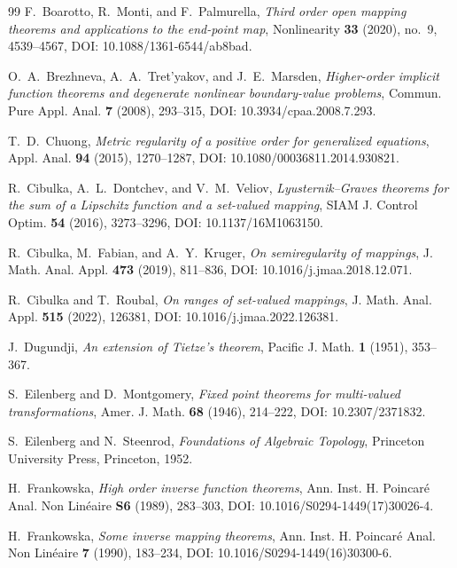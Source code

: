 \documentclass[11pt]{amsart}
\theoremstyle{definition}
\theoremstyle{remark}
\begin{document}
\begin{thebibliography}{99}
		F.~Boarotto, R.~Monti, and F.~Palmurella,
		\emph{Third order open mapping theorems and applications to the end-point
			map},
		Nonlinearity \textbf{33} (2020), no.~9, 4539--4567,
		DOI: 10.1088/1361-6544/ab8bad.
		
		O.~A.~Brezhneva, A.~A.~Tret'yakov, and J.~E.~Marsden,
		\emph{Higher-order implicit function theorems and degenerate nonlinear
			boundary-value problems},
		Commun. Pure Appl. Anal. \textbf{7} (2008), 293--315,
		DOI: 10.3934/cpaa.2008.7.293.
		
		T.~D.~Chuong,
		\emph{Metric regularity of a positive order for generalized equations},
		Appl. Anal. \textbf{94} (2015), 1270--1287,
		DOI: 10.1080/00036811.2014.930821.
		
		R.~Cibulka, A.~L.~Dontchev, and V.~M.~Veliov,
		\emph{Lyusternik--Graves theorems for the sum of a Lipschitz function
			and a set-valued mapping},
		SIAM J. Control Optim. \textbf{54} (2016), 3273--3296,
		DOI: 10.1137/16M1063150.
		
		R.~Cibulka, M.~Fabian, and A.~Y.~Kruger,
		\emph{On semiregularity of mappings},
		J. Math. Anal. Appl. \textbf{473} (2019), 811--836,
		DOI: 10.1016/j.jmaa.2018.12.071.
		
		R.~Cibulka and T.~Roubal,
		\emph{On ranges of set-valued mappings},
		J. Math. Anal. Appl. \textbf{515} (2022), 126381,
		DOI: 10.1016/j.jmaa.2022.126381.
		
		J.~Dugundji,
		\emph{An extension of Tietze's theorem},
		Pacific J. Math. \textbf{1} (1951), 353--367.
		
		S.~Eilenberg and D.~Montgomery,
		\emph{Fixed point theorems for multi-valued transformations},
		Amer. J. Math. \textbf{68} (1946), 214--222,
		DOI: 10.2307/2371832.
		
		S.~Eilenberg and N.~Steenrod,
		\emph{Foundations of Algebraic Topology},
		Princeton University Press, Princeton, 1952.
		
		H.~Frankowska,
		\emph{High order inverse function theorems},
		Ann. Inst. H. Poincar\'e Anal. Non Lin\'eaire \textbf{S6} (1989),
		283--303,
		DOI: 10.1016/S0294-1449(17)30026-4.
		
		H.~Frankowska,
		\emph{Some inverse mapping theorems},
		Ann. Inst. H. Poincar\'e Anal. Non Lin\'eaire \textbf{7} (1990),
		183--234,
		DOI: 10.1016/S0294-1449(16)30300-6.
		

\end{thebibliography}
\end{document}
